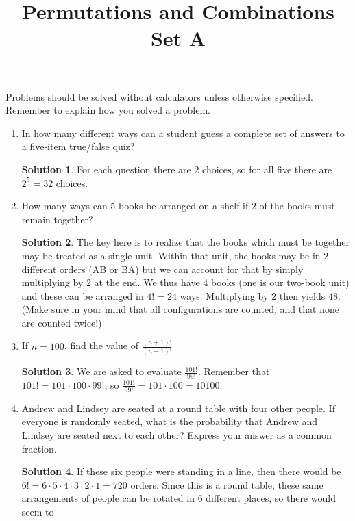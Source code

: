 \documentclass{article}
\title{Permutations and Combinations Set A}
\author{}
\date{}
\theoremstyle{definition}
\newtheorem*{solution}{Solution}
\begin{document}
    \maketitle
    \noindent Problems should be solved without calculators unless otherwise specified.
    Remember to explain how you solved a problem.
    \begin{enumerate}
        \item In how many different ways can a student guess a complete set of answers to a
        five-item true/false quiz?
        \begin{solution}
            For each question there are $2$ choices, so for all five there are $2^5 = 32$ choices.
        \end{solution}
        \item How many ways can $5$ books be arranged on a shelf if $2$ of the books must
        remain together?
        \begin{solution}
            The key here is to realize that the books which must be together may be treated as a
            single unit. Within that unit, the books may be in $2$ different orders (AB or BA) but
            we can account for that by simply multiplying by $2$ at the end. We thus have $4$ books
            (one is our two-book unit) and these can be arranged in $4! = 24$ ways. Multiplying by
            $2$ then yields $48$. (Make sure in your mind that all configurations are counted, and
            that none are counted twice!)
        \end{solution}
        \item If $n = 100$, find the value of $\frac{(n+1)!}{(n-1)!}$
        \begin{solution}
            We are asked to evaluate $\frac{101!}{99!}$. Remember that $101! = 101 \cdot 100 \cdot
            99!$, so $\frac{101!}{99!} = 101 \cdot 100 = 10100$.
        \end{solution}
        \item Andrew and Lindsey are seated at a round table with four other people. If everyone
        is randomly seated, what is the probability that Andrew and Lindsey are seated next to
        each other? Express your answer as a common fraction.
        \begin{solution}
            If these six people were standing in a line, then there would be $6! = 6 \cdot 5 \cdot
            4 \cdot 3 \cdot 2 \cdot 1 = 720$ orders. Since this is a round table, these same
            arrangements of people can be rotated in $6$ different places, so there would seem to

\end{solution}
\end{enumerate}
\end{document}

